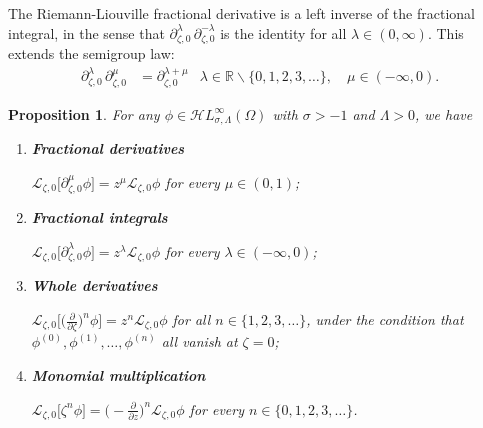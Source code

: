 \documentclass{article}
\newcommand{\singexp}[2]{\mathcal{H}L^\infty_{#1, #2}}
\newcommand{\R}{\mathbb{R}}
\newcommand{\fracderiv}[3]{\partial^{#1}_{#2, #3}}
\newcommand{\laplace}{\mathcal{L}}
\theoremstyle{definition}
\theoremstyle{plain}
\newtheorem{prop}[definition]{Proposition}
\begin{document}
The Riemann-Liouville fractional derivative is a left inverse of the fractional integral, in the sense that $\fracderiv{\lambda}{\zeta}{ 0}\,\fracderiv{-\lambda}{\zeta}{0}$ is the identity for all $\lambda \in (0, \infty)$. This extends the semigroup law:
\begin{align*}
\fracderiv{\lambda}{\zeta}{0}\,\fracderiv{\mu}{\zeta}{0} & = \fracderiv{\lambda+\mu}{\zeta}{0} & \lambda \in \R \smallsetminus \{0, 1, 2, 3, \ldots\},\quad\mu \in (-\infty, 0).
\end{align*}
\begin{prop}\label{prop:L-int-op}
For any $\phi\in\singexp{\sigma}{\Lambda}(\Omega)$ with $\sigma>-1$ and $\Lambda>0$, we have
\begin{enumerate}[label=(\roman*)]
\item\label{res:frac-deriv} \textbf{Fractional derivatives}

$\laplace_{\zeta,0} \big[\fracderiv{\mu}{\zeta}{0} \phi\big] = z^{\mu} \laplace_{\zeta,0} \phi$ for every $\mu\in(0,1)$;
\item\label{res:frac-int} \textbf{Fractional integrals}

$\laplace_{\zeta,0} \big[\fracderiv{\lambda}{\zeta}{0} \phi\big] = z^{\lambda} \laplace_{\zeta,0} \phi$ for every $\lambda\in(-\infty,0)$;
\item\label{res:whole-deriv} \textbf{Whole derivatives}

$\laplace_{\zeta,0} \big[\big(\frac{\partial}{\partial\zeta}\big)^n \phi\big] = z^{n} \laplace_{\zeta,0} \phi$ for all $n\in\{1, 2, 3, \ldots\}$, under the condition that $\phi^{(0)}, \phi^{(1)}, \ldots, \phi^{(n)}$ all vanish at $\zeta = 0$;
\item\label{res:monom-mult} \textbf{Monomial multiplication}

$\laplace_{\zeta,0} \big[\zeta^n \phi\big] = \big(-\frac{\partial}{\partial z}\big)^n \laplace_{\zeta,0} \phi$ for every $n\in\{0,1,2,3,\ldots\}$.
\end{enumerate}
\end{prop}
\end{document}
